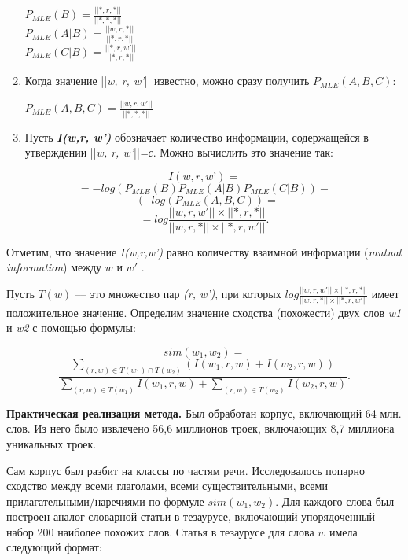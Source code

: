 \documentclass{article}
\begin{document}
\begin{articletext}
\begin{enumerate}
$P_{MLE}(B)=\frac{\displaystyle ||*,r,*||}{\displaystyle ||*,*,*||}$\\
$P_{MLE}(A|B)=\frac{\displaystyle ||w,r,*||}{\displaystyle ||*,r,*||}$\\
$P_{MLE}(C|B)=\frac{\displaystyle ||*,r,w'||}{\displaystyle ||*,r,*||}$

\item Когда значение ||\textit{w, r, w’}|| известно, можно сразу получить $P_{MLE}(A,B,C)$:

$P_{MLE}(A,B,C)=\frac{\displaystyle ||w,r,w'||}{\displaystyle ||*,*,*||}$
\item Пусть \textit{\textbf{I(w,r, w’)}} обозначает количество информации, содержащейся 
в утверждении ||\textit{w, r, w'}||\textit{=с}. Можно вычислить это значение так:
\end{enumerate}

$$
I(w,r,w’)=
$$
$$
=-log(P_{MLE}(B) P_{MLE} (A|B) P_{MLE} (C|B))-
$$
$$
-(-log(P_{MLE}(A,B,C))=
$$
$$
=log\frac{||w,r,w'||\times||*,r,*||}{||w,r,*||\times||*,r,w'||}.
$$


Отметим, что значение \textit{I(w,r,w’)} равно количеству взаимной информации (\textit{mutual information}) между $w$ и $w'$ \cite{Donald 1990}.

Пусть $T(w)$ --– это множество пар \textit{(r, w')}, при которых $log\frac{\displaystyle ||w,r,w'||\times||*,r,*||}{\displaystyle ||w,r,*||\times||*,r,w'||}$ имеет положительное значение. Определим значение сходства (похожести) двух слов \textit{w1} и \textit{w2} с помощью формулы:

$$
sim(w_1,w_2)=
$$
$$
\frac{\displaystyle \sum_{(r,w)\in T(w_1)\cap T(w_2)}(I(w_1,r,w)+I(w_2,r,w))}{\displaystyle \sum_{(r,w)\in T(w_1)}I(w_1,r,w)+\sum_{(r,w)\in T(w_2)}I(w_2,r,w)}.
$$

\textbf{Практическая реализация метода.} Был обработан корпус, включающий 64 млн. слов. Из него было извлечено 56,6 миллионов троек, включающих 8,7 миллиона уникальных троек.

Сам корпус был разбит на классы по частям речи.  Исследовалось попарно сходство между всеми глаголами, всеми существительными, всеми прилагательными/наречиями по формуле $sim(w_1 , w_2)$. Для каждого слова был построен аналог словарной статьи в тезаурусе, включающий упорядоченный набор 200 наиболее похожих слов. Статья в тезаурусе для слова $w$ имела следующий формат:\\


\end{articletext}
\end{document}
